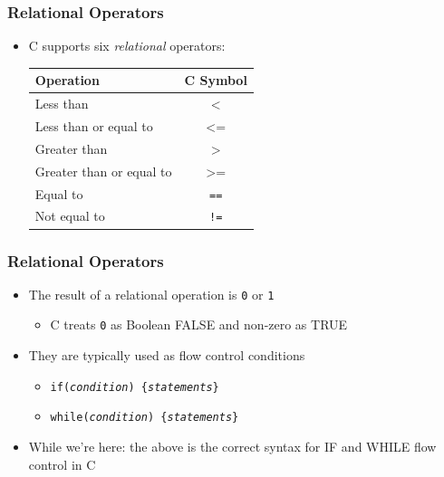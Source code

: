 \documentclass[14pt]{beamer}
\begin{document}
\begin{frame}
\frametitle{Relational Operators}
\begin{itemize}
\item C supports six \textit{relational} operators:
\begin{table}[H]
\centering
\begin{tabular}{|l|c|}
\hline
Operation      & C Symbol \\
\hline
Less than       & $\texttt{<}$        \\
Less than or equal to    & $\texttt{<=}$\\
Greater than & $\texttt{>}$        \\
Greater than or equal to       & $\texttt{>=}$       \\
Equal to & \texttt{==} \\
Not equal to & \texttt{!=} \\
\hline
\end{tabular}
\end{table}
\end{itemize}
\end{frame}

\begin{frame}
\frametitle{Relational Operators}
\begin{itemize}
\item The result of a relational operation is \texttt{0} or \texttt{1}
	\begin{itemize}
		\item C treats \texttt{0} as Boolean FALSE and non-zero as TRUE
	\end{itemize}
\item They are typically used as flow control conditions
	\begin{itemize}
		\item \texttt{if(\textit{condition}) \{\textit{statements}\}}
		\item \texttt{while(\textit{condition}) \{\textit{statements}\}}
	\end{itemize}
\item While we're here: the above is the correct syntax for IF and WHILE flow control in C
\end{itemize}
\end{frame}
\end{document}
